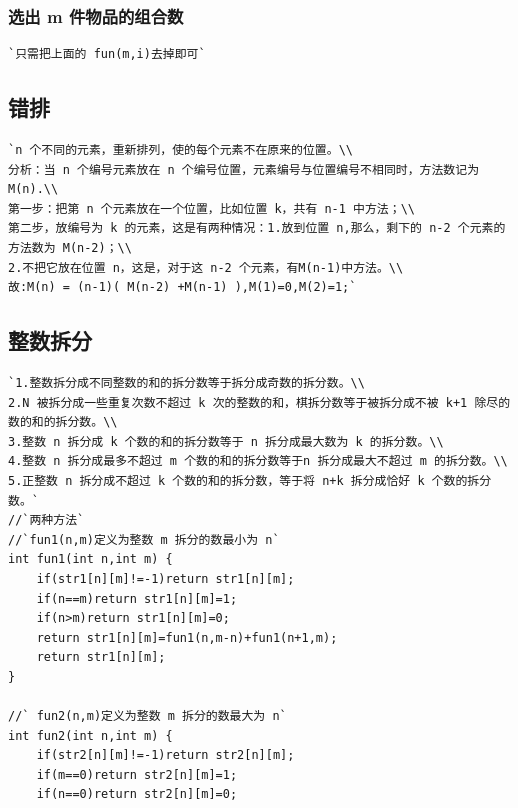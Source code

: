 \documentclass[a4paper]{article}
\begin{document}
\begin{CJK*}{UTF8}{gbsn}
\begin{multicols}{3}
\begin{flushleft}
\subsubsection{选出 m 件物品的组合数}
\begin{lstlisting}
`只需把上面的 fun(m,i)去掉即可`
\end{lstlisting}



\subsection{错排}
\begin{lstlisting}
`n 个不同的元素，重新排列，使的每个元素不在原来的位置。\\
分析：当 n 个编号元素放在 n 个编号位置，元素编号与位置编号不相同时，方法数记为 M(n).\\
第一步：把第 n 个元素放在一个位置，比如位置 k，共有 n-1 中方法；\\
第二步，放编号为 k 的元素，这是有两种情况：1.放到位置 n,那么，剩下的 n-2 个元素的方法数为 M(n-2)；\\
2.不把它放在位置 n，这是，对于这 n-2 个元素，有M(n-1)中方法。\\
故:M(n) = (n-1)( M(n-2) +M(n-1) ),M(1)=0,M(2)=1;`
\end{lstlisting}

\subsection{整数拆分}
\begin{lstlisting}
`1.整数拆分成不同整数的和的拆分数等于拆分成奇数的拆分数。\\
2.N 被拆分成一些重复次数不超过 k 次的整数的和，棋拆分数等于被拆分成不被 k+1 除尽的数的和的拆分数。\\
3.整数 n 拆分成 k 个数的和的拆分数等于 n 拆分成最大数为 k 的拆分数。\\
4.整数 n 拆分成最多不超过 m 个数的和的拆分数等于n 拆分成最大不超过 m 的拆分数。\\
5.正整数 n 拆分成不超过 k 个数的和的拆分数，等于将 n+k 拆分成恰好 k 个数的拆分数。`
//`两种方法`
//`fun1(n,m)定义为整数 m 拆分的数最小为 n`
int fun1(int n,int m) {
    if(str1[n][m]!=-1)return str1[n][m];
    if(n==m)return str1[n][m]=1;
    if(n>m)return str1[n][m]=0;
    return str1[n][m]=fun1(n,m-n)+fun1(n+1,m);
    return str1[n][m];
}

//` fun2(n,m)定义为整数 m 拆分的数最大为 n`
int fun2(int n,int m) {
    if(str2[n][m]!=-1)return str2[n][m];
    if(m==0)return str2[n][m]=1;
    if(n==0)return str2[n][m]=0;


\end{lstlisting}
\end{flushleft}
\end{multicols}
\end{CJK*}
\end{document}
